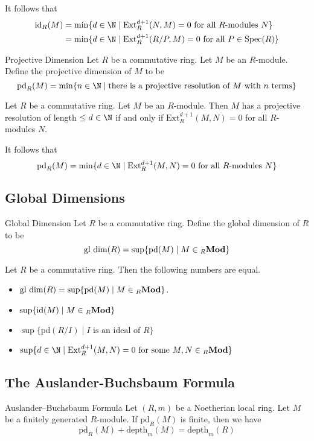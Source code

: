 \documentclass[a4paper]{article}
\begin{document}
It follows that 
\begin{align*}
\text{id}_R(M)&=\min\{d\in\N\;|\;\text{Ext}_R^{d+1}(N,M)=0\text{ for all }R\text{-modules }N\}\\
&=\min\{d\in\N\;|\;\text{Ext}_R^{d+1}(R/P,M)=0\text{ for all }P\in\text{Spec}(R)\}
\end{align*}

\begin{defn}{Projective Dimension}{} Let $R$ be a commutative ring. Let $M$ be an $R$-module. Define the projective dimension of $M$ to be $$\text{pd}_R(M)=\min\{n\in\N\;|\;\text{there is a projective resolution of }M\text{ with }n\text{ terms}\}$$
\end{defn}

\begin{prp}{}{} Let $R$ be a commutative ring. Let $M$ be an $R$-module. Then $M$ has a projective resolution of length $\leq d\in\N$ if and only if $\text{Ext}_R^{d+1}(M,N)=0$ for all $R$-modules $N$. 
\end{prp}

It follows that $$\text{pd}_R(M)=\min\{d\in\N\;|\;\text{Ext}_R^{d+1}(M,N)=0\text{ for all }R\text{-modules }N\}$$

\subsection{Global Dimensions}
\begin{defn}{Global Dimension}{} Let $R$ be a commutative ring. Define the global dimension of $R$ to be $$\text{gl dim}(R)=\sup\{\text{pd}(M)\;|\;M\in{_R\bold{Mod}}\}$$
\end{defn}

\begin{prp}{}{} Let $R$ be a commutative ring. Then the following numbers are equal. 
\begin{itemize}
\item $\text{gl dim}(R)=\sup\{\text{pd}(M)\;|\;M\in{_R\bold{Mod}}\}$. 
\item $\sup\{\text{id}(M)\;|\;M\in{_R\bold{Mod}}\}$
\item $\sup\{\text{pd}(R/I)\;|\;I\text{ is an ideal of }R\}$
\item $\sup\{d\in\N\;|\;\text{Ext}_R^{d+1}(M,N)=0\text{ for some }M,N\in{_R\bold{Mod}}\}$
\end{itemize}
\end{prp}

\subsection{The Auslander-Buchsbaum Formula}
\begin{thm}{Auslander–Buchsbaum Formula}{} Let $(R,m)$ be a Noetherian local ring. Let $M$ be a finitely generated $R$-module. If $\text{pd}_R(M)$ is finite, then we have $$\text{pd}_R(M)+\text{depth}_m(M)=\text{depth}_m(R)$$
\end{thm}
\end{document}
